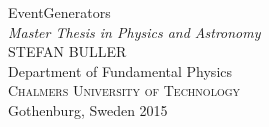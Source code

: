 \begin{titlepage}
\mbox{}
\vfill
\vspace*{-2cm}
\addtolength{\voffset}{2cm}
\begin{flushleft}
\vspace*{3cm}
	{\noindent \LARGE{EventGenerators} \\[0.3cm]
	\emph{\Large Master Thesis in Physics and Astronomy} \\[.8cm]
	
	\Large{STEFAN BULLER}\\[.8cm]
	
	{\Large Department of Fundamental Physics \\
	\textsc{Chalmers University of Technology} \\
	Gothenburg, Sweden 2015 \\
	} 
	}
\end{flushleft}
\end{titlepage}
\ClearShipoutPicture
\pagestyle{empty}
\clearpage
\mbox{}
\clearpage
\thispagestyle{empty}

